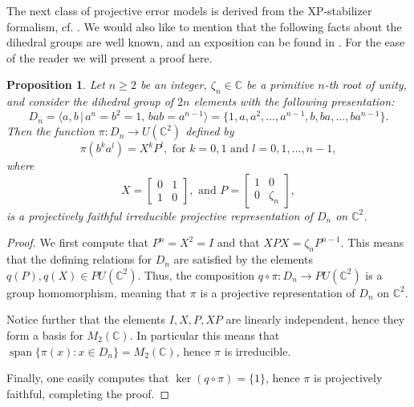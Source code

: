 \documentclass[11pt, oneside, reqno]{amsart}
\newcommand{\bbC}{\mathbb{C}}
\newcommand{\Span}{\operatorname{span}}
\theoremstyle{definition}
\theoremstyle{plain}
\newtheorem{proposition}[definition]{Proposition}
\theoremstyle{remark}
\begin{document}
The next class of projective error models is derived from the XP-stabilizer formalism, cf. \cite{Webster2022}. We would also like to mention that the following facts about the dihedral groups are well known, and an exposition can be found in \cite[Chapter 3.7]{Karpilovsky85}. For the ease of the reader we will present a proof here.

\begin{proposition}\label{prop:projective XP-error model}
    Let $n \geq 2$ be an integer, $\zeta_n \in \bbC$ be a primitive $n$-th root of unity, and consider the dihedral group of $2n$ elements with the following presentation:
    \begin{equation*}
        D_n = \langle a,b \, \vert \, a^n = b^2 = 1, \, bab = a^{n-1} \rangle = \{ 1, a, a^2, \dots, a^{n-1}, b, ba, \dots, ba^{n-1} \}.
    \end{equation*}
    Then the function $\pi \colon D_n \to U(\bbC^2)$ defined by
    \begin{equation*}
        \pi(b^ka^l) = X^k P^l, \text{ for } k = 0,1 \text{ and } l = 0,1,\dots,n-1,
    \end{equation*}
    where 
    \begin{equation*}
        X =
        \begin{bmatrix}
            0 & 1 \\
            1 & 0
        \end{bmatrix},
        \text{ and }
        P =
        \begin{bmatrix}
            1 & 0 \\
            0 & \zeta_n
        \end{bmatrix},
    \end{equation*}
    is a projectively faithful irreducible projective representation of $D_n$ on $\bbC^2$.
\end{proposition}
\begin{proof}
    We first compute that $P^n = X^2 = I$ and that $XPX = \zeta_n P^{n-1}$. This means that the defining relations for $D_n$ are satisfied by the elements $q(P), q(X) \in PU(\bbC^2)$. Thus, the composition $q \circ \pi \colon D_n \to PU(\bbC^2)$ is a group homomorphism, meaning that $\pi$ is a projective representation of $D_n$ on $\bbC^2$.

    Notice further that the elements $I, X, P, XP$ are linearly independent, hence they form a basis for $M_2(\bbC)$. In particular this means that $\Span\{\pi(x) \colon x \in D_n\} = M_2(\bbC)$, hence $\pi$ is irreducible.

    Finally, one easily computes that $\ker(q \circ \pi) = \{ 1 \}$, hence $\pi$ is projectively faithful, completing the proof.
\end{proof}
\end{document}
